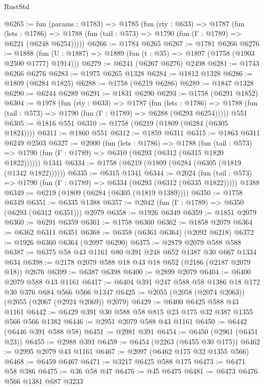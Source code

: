 \begin{lexlean}{RustStd}
\begin{coremodule}
{\begin{coremodule}
{{{{{{{{{{{{{{{@6265 := fun (params : @1783) =>
  @1785
    (fun (rty : @633) =>
    @1787
      (fun (lets : @1786) =>
      @1788 (fun (tail : @573) => @1790 (fun (Γ : @1789) => @6221 (@6248 @6254)))))
@6266 := @1784 @6265
@6267 := @1781 @6266
@6276 := @1888 (fun (U : @1887) => @1889 (fun (t : @35) => @1897 (@1758 (@1903 @2500 @1777) @1914)))
@6279 := @6241 (@6267 @6276) @2498
@6281 := @1743 @6266 @6276
@6283 := @1975 @6265 @1328
@6284 := @1812 @1328
@6286 := @1809 (@6284 @1825)
@6288 := @1758 (@6219 @6286)
@6289 := @1847 @1328
@6290 := @6244 @6289
@6291 := @1831 @6290
@6293 := @1758 (@6291 @1852)
@6304 := @1978
    (fun (rty : @633) =>
    @1787
      (fun (lets : @1786) =>
      @1788 (fun (tail : @573) => @1790 (fun (Γ : @1789) => @6288 (@6293 @6254)))))
    @551
@6305 := @1816 @551
@6310 := @1758 (@6219 (@1809 (@6284 (@6305 @1824))))
@6311 := @1860 @551
@6312 := @1859 @6311
@6315 := @1863 @6311 @6249 @2503
@6327 := @2000
    (fun (lets : @1786) =>
    @1788
      (fun (tail : @573) => @1790 (fun (Γ : @1789) => @6310 (@6293 (@6312 (@6315 @1820 @1822))))))
    @1341
@6334 := @1758 (@6219 (@1809 (@6284 (@6305 (@1819 (@1342 @1822))))))
@6335 := @6315 @1341
@6344 := @2024
    (fun (tail : @573) => @1790 (fun (Γ : @1789) => @6334 (@6293 (@6312 (@6335 @1822)))))
    @1388
@6349 := @6219 (@1809 (@6284 (@6305 (@1819 @1389))))
@6350 := @1758 @6349
@6351 := @6335 @1388
@6357 := @2042 (fun (Γ : @1789) => @6350 (@6293 (@6312 @6351))) @2079
@6358 := @1926 @6349
@6359 := @1851 @2079
@6360 := @6291 @6359
@6361 := @1758 @6360
@6362 := @1858 @2079
@6364 := @6362 @6311 @6351
@6368 := @6358 (@6361 @6364) (@2092 @6218)
@6372 := @1926 @6360 @6364 (@2097 @6290)
@6375 := @2879 @2079 @588 @588
@6387 := @6375 @58 @43 @1161 @80 @391 @248 @652 @1387 @30 @667 @1334 @634
@6398 := @2178 @2079 @588 @18 @43 @18 @652 (@2186 (@2187 @2079 @18)) @2676
@6399 := @6387 @6398
@6400 := @2899 @2079
@6404 := @6400 @2079 @588 @43 @1161
@6417 := @6404 @391 @247 @588 @58 @1386 @18 @172 @30 @376 @684 @566 @566 @1347
@6425 := @2055 (@2058 (@2074 @2063)) (@2055 (@2067 (@2924 @2069)) @2079)
@6429 := @6400 @6425 @588 @43 @1161
@6442 := @6429 @391 @30 @588 @58 @815 @23 @175 @32 @387 @1355 @566 @566 @1382
@6446 := @2951 @2079 @588 @43 @1161
@6450 := @6442 (@6446 @391 @588 @58)
@6451 := @2981 @391
@6454 := @6450 (@2961 (@6451 @23))
@6455 := @2988 @391
@6459 := @6454 (@2263 (@6455 @30 @175))
@6462 := @2995 @2079 @43 @1161
@6467 := @2097 (@6462 @175 @32 @1355 @566)
@6468 := @6459 @6467
@6471 := @3217 @6425 @588 @175
@6473 := @6471 @58 @386
@6475 := @36 @58 @47
@6476 := @45 @6475
@6481 := @6473 @6476 @566 @1381 @687 @3233
}}}}}}}}}}}}}}}
\end{coremodule}}
\end{coremodule}
\end{lexlean}
